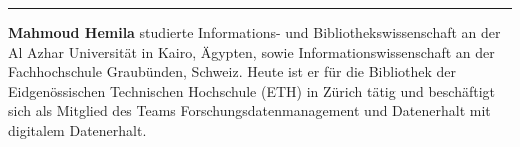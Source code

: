 \begin{center}\rule{0.5\linewidth}{0.5pt}\end{center}

\textbf{Mahmoud Hemila} studierte Informations- und
Bibliothekswissenschaft an der Al Azhar Universität in Kairo, Ägypten,
sowie Informationswissenschaft an der Fachhochschule Graubünden,
Schweiz. Heute ist er für die Bibliothek der Eidgenössischen Technischen
Hochschule (ETH) in Zürich tätig und beschäftigt sich als Mitglied des
Teams Forschungsdatenmanagement und Datenerhalt mit digitalem
Datenerhalt.
